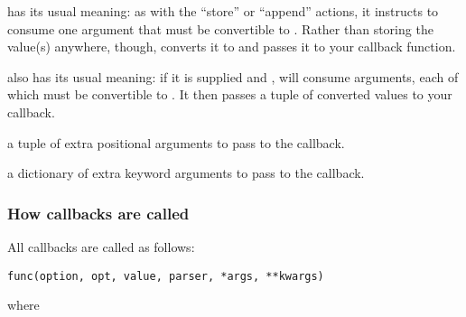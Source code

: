 \begin{definitions}
has its usual meaning: as with the ``store'' or ``append'' actions, it
instructs  to consume one argument that must be
convertible to .  Rather than storing the value(s) anywhere,
though,  converts it to  and passes it to
your callback function.

also has its usual meaning: if it is supplied and ,
 will consume  arguments, each of which
must be convertible to .  It then passes a tuple of
converted values to your callback.

a tuple of extra positional arguments to pass to the callback.
    
a dictionary of extra keyword arguments to pass to the callback.
\end{definitions}

\subsubsection{How callbacks are called\label{optparse-callbacks-called}}

All callbacks are called as follows:

\begin{verbatim}
func(option, opt, value, parser, *args, **kwargs)
\end{verbatim}

where

